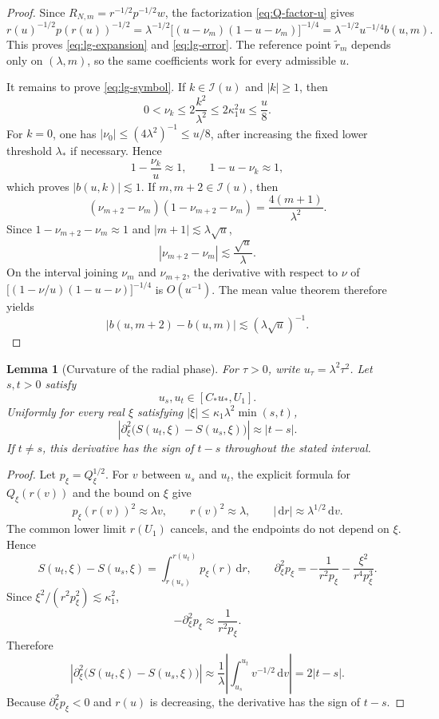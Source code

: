 \documentclass[10pt,a4paper]{amsart}
\newtheorem{lemma}[theorem]{Lemma}
\numberwithin{equation}{section}
\newcommand{\dd}{\,\mathrm d}
\begin{document}
\begin{proof}
Since \(R_{N,m}=r^{-1/2}p^{-1/2}w\), the factorization
\eqref{eq:Q-factor-u} gives
\[
 r(u)^{-1/2}p(r(u))^{-1/2}
 =\lambda^{-1/2}
  \bigl[(u-\nu_m)(1-u-\nu_m)\bigr]^{-1/4}
 =\lambda^{-1/2}u^{-1/4}b(u,m).
\]
This proves \eqref{eq:lg-expansion} and \eqref{eq:lg-error}. The reference
point \(\tilde r_m\) depends only on \((\lambda,m)\), so the same
coefficients work for every admissible \(u\).

It remains to prove \eqref{eq:lg-symbol}. If
\(k\in\mathcal I(u)\) and \(|k|\ge1\), then
\[
 0<\nu_k\le 2\frac{k^2}{\lambda^2}
 \le2\kappa_1^2u\le\frac u8.
\]
For \(k=0\), one has \(|\nu_0|\le(4\lambda^2)^{-1}\le u/8\), after
increasing the fixed lower threshold \(\lambda_*\) if necessary. Hence
\[
 1-\frac{\nu_k}{u}\approx1,
 \qquad
 1-u-\nu_k\approx1,
\]
which proves \(|b(u,k)|\lesssim1\). If
\(m,m+2\in\mathcal I(u)\), then
\[
 (\nu_{m+2}-\nu_m)(1-\nu_{m+2}-\nu_m)
 =\frac{4(m+1)}{\lambda^2}.
\]
Since \(1-\nu_{m+2}-\nu_m\approx1\) and
\(|m+1|\lesssim\lambda\sqrt u\),
\[
 |\nu_{m+2}-\nu_m|\lesssim\frac{\sqrt u}{\lambda}.
\]
On the interval joining \(\nu_m\) and \(\nu_{m+2}\), the derivative with
respect to \(\nu\) of
\(\bigl[(1-\nu/u)(1-u-\nu)\bigr]^{-1/4}\) is \(O(u^{-1})\).
The mean value theorem therefore yields
\[
 |b(u,m+2)-b(u,m)|\lesssim(\lambda\sqrt u)^{-1}.
\]
\end{proof}



\begin{lemma}[Curvature of the radial phase]\label{lem:phase-second-variation}
For \(\tau>0\), write \(u_\tau=\lambda^2\tau^2\). Let \(s,t>0\) satisfy
\[
 u_s,u_t\in[C_*u_*,U_1].
\]
Uniformly for every real \(\xi\) satisfying
\(|\xi|\le\kappa_1\lambda^2\min(s,t)\),
\[
 \left|\partial_\xi^2\bigl(S(u_t,\xi)-S(u_s,\xi)\bigr)\right|
 \approx|t-s|.
\]
If \(t\ne s\), this derivative has the sign of \(t-s\) throughout the
stated interval.
\end{lemma}

\begin{proof}
Let \(p_\xi=Q_\xi^{1/2}\). For \(v\) between \(u_s\) and \(u_t\),
the explicit formula for \(Q_\xi(r(v))\) and the bound on \(\xi\) give
\[
 p_\xi(r(v))^2\approx\lambda v,
 \qquad r(v)^2\approx\lambda,
 \qquad |\dd r|\approx\lambda^{1/2}\dd v.
\]
The common lower limit \(r(U_1)\) cancels, and the endpoints do not depend
on \(\xi\). Hence
\[
 S(u_t,\xi)-S(u_s,\xi)
 =\int_{r(u_s)}^{r(u_t)}p_\xi(r)\dd r,
 \qquad
 \partial_\xi^2p_\xi
 =-\frac1{r^2p_\xi}-\frac{\xi^2}{r^4p_\xi^3}.
\]
Since \(\xi^2/(r^2p_\xi^2)\lesssim\kappa_1^2\),
\[
 -\partial_\xi^2p_\xi\approx\frac1{r^2p_\xi}.
\]
Therefore
\[
 \left|\partial_\xi^2\bigl(S(u_t,\xi)-S(u_s,\xi)\bigr)\right|
 \approx\frac1\lambda
 \left|\int_{u_s}^{u_t}v^{-1/2}\dd v\right|
 =2|t-s|.
\]
Because \(\partial_\xi^2p_\xi<0\) and \(r(u)\) is decreasing, the derivative
has the sign of \(t-s\).
\end{proof}
\end{document}
